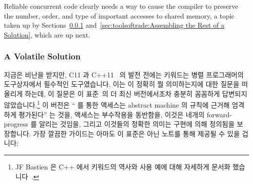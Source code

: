 Reliable concurrent code clearly needs a way to cause the compiler to
preserve the number, order, and type of important accesses to shared
memory, a topic taken up by
Sections~\ref{sec:toolsoftrade:A Volatile Solution}
and~\ref{sec:toolsoftrade:Assembling the Rest of a Solution},
which are up next.

\fi

\subsubsection{A Volatile Solution}
\label{sec:toolsoftrade:A Volatile Solution}

지금은 비난을 받지만, C11 과 C++11~\cite{PeteBecker2011N3242} 의 발전 전에는
 키워드는 병렬 프로그래머의 도구상자에서 필수적인 도구였습니다.
이는  이 정확히 뭘 의미하는지에 대한 질문을 떠올리게 하는데, 이
질문은 이 표준~\cite{RichardSmith2019N4800}의 더 최신 버전에서조차 충분히
꼼꼼하게 답변되지 않았습니다.\footnote{
	JF Bastien 은 C++ 에서  키워드의 역사와 사용 예에 대해
	자세하게 문서화 했습니다~\cite{JFBastien2018DeprecatingVolatile}.}
이 버전은 ``  를 통한 액세스는 abstract machine 의
규칙에 근거해 엄격하게 평가된다'' 는 것을,  액세스는 부수작용을
동반함을, 이것은 네개의 forward-progress 를 알리는 것임을, 그리고 이것들의
정확한 의미는 구현에 의해 정의됨을 보장합니다.
가장 깔끔한 가이드는 아마도 이 표준은 아닌 노트를 통해 제공될 수 있을 겁니다:

